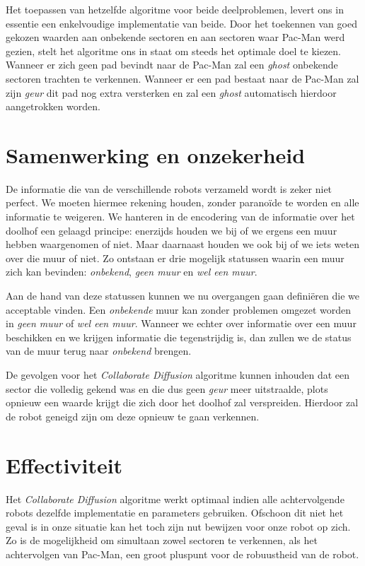 \documentclass[12pt,a4paper]{report}
\begin{document}
Het toepassen van hetzelfde algoritme voor beide deelproblemen, levert ons in essentie een enkelvoudige implementatie van beide. Door het toekennen van goed gekozen waarden aan onbekende sectoren en aan sectoren waar Pac-Man werd gezien, stelt het algoritme ons in staat om steeds het optimale doel te kiezen. Wanneer er zich geen pad bevindt naar de Pac-Man zal een \emph{ghost} onbekende sectoren trachten te verkennen. Wanneer er een pad bestaat naar de Pac-Man zal zijn \emph{geur} dit pad nog extra versterken en zal een \emph{ghost} automatisch hierdoor aangetrokken worden.

\section{Samenwerking en onzekerheid}

De informatie die van de verschillende robots verzameld wordt is zeker niet perfect. We moeten hiermee rekening houden, zonder parano\"ide te worden en alle informatie te weigeren. We hanteren in de encodering van de informatie over het doolhof een gelaagd principe: enerzijds houden we bij of we ergens een muur hebben waargenomen of niet. Maar daarnaast houden we ook bij of we iets weten over die muur of niet. Zo ontstaan er drie mogelijk statussen waarin een muur zich kan bevinden: \emph{onbekend}, \emph{geen muur} en \emph{wel een muur}.

Aan de hand van deze statussen kunnen we nu overgangen gaan defini\"eren die we acceptable vinden. Een \emph{onbekende} muur kan zonder problemen omgezet worden in \emph{geen muur} of \emph{wel een muur}. Wanneer we echter over informatie over een muur beschikken en we krijgen informatie die tegenstrijdig is, dan zullen we de status van de muur terug naar \emph{onbekend} brengen.

De gevolgen voor het \emph{Collaborate Diffusion} algoritme kunnen inhouden dat een sector die volledig gekend was en die dus geen \emph{geur} meer uitstraalde, plots opnieuw een waarde krijgt die zich door het doolhof zal verspreiden. Hierdoor zal de robot geneigd zijn om deze opnieuw te gaan verkennen.

\section{Effectiviteit}

Het \emph{Collaborate Diffusion} algoritme werkt optimaal indien alle achtervolgende robots dezelfde implementatie en parameters gebruiken. Ofschoon dit niet het geval is in onze situatie kan het toch zijn nut bewijzen voor onze robot op zich. Zo is de mogelijkheid om simultaan zowel sectoren te verkennen, als het achtervolgen van Pac-Man, een groot pluspunt voor de robuustheid van de robot.
\end{document}
